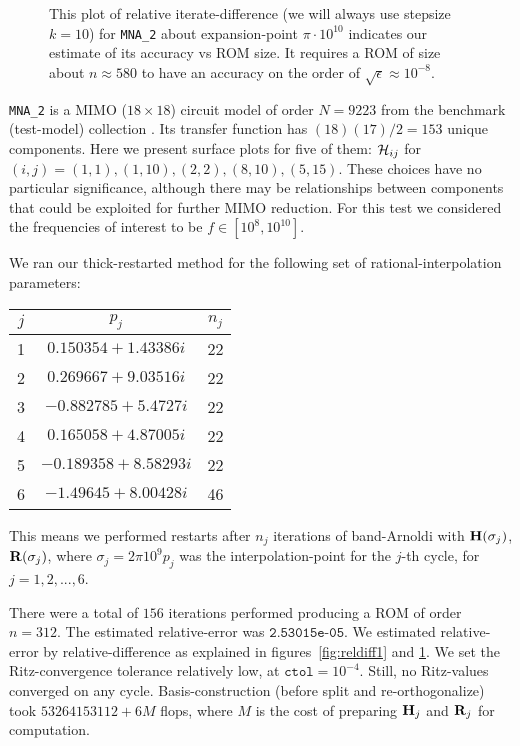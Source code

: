 \begin{figure}
\centering
{}
\caption{\label{fig:reldiff2}This plot of relative iterate-difference (we will always use stepsize $k=10$) for \texttt{MNA\_2} about expansion-point $\pi\cdot10^{10}$ indicates our estimate of its accuracy vs ROM size.  It requires a ROM of size about $n\approx 580$ to have an accuracy on the order of $\sqrt{\epsilon}\approx10^{-8}$. }
\end{figure}
\texttt{MNA\_2} is a MIMO ($18 \times 18$) circuit model of order $N=9223$ from the benchmark (test-model) collection \cite{chahlaoui2002collection}.  Its transfer function has $(18)(17)/2 = 153$ unique components.  Here we present surface plots for five of them: $\mathcal{H}_{ij}$ for $(i,j) =  (1 ,1), (1 ,10),  (2 ,2), (8, 10), (5, 15)$.  These choices have no particular significance, although there may be relationships between components that could be exploited for further MIMO reduction.  For this test we considered the frequencies of interest to be $f\in[10^{8}, 10^{10}]$. 

We ran our thick-restarted method for the following set of rational-interpolation parameters: 
{\singlespacing
\begin{tabular}{ccc}
$j$ & $p_j$ & $n_j$\\
\hline
1 & $0.150354 + 1.43386i$ & 22 \\
2 & $0.269667 + 9.03516i$ & 22\\
3 & $-0.882785 + 5.4727i$ & 22\\
4 & $0.165058 + 4.87005i$ & 22 \\
5 & $-0.189358 + 8.58293i$ & 22\\
6 & $-1.49645 + 8.00428i$ & 46 \\
\end{tabular}
}

\medskip
This means we performed restarts after $n_j$ iterations of band-Arnoldi with $\textbf{\textup{H}}(\sigma_j)$, $\textbf{\textup{R}}(\sigma_j)$, where $\sigma_j = 2\pi10^9  p_j$ was the interpolation-point for the $j$-th cycle, for $j=1,2,...,6$.

There were a total of $156$ iterations performed producing a ROM of order $n=312$.  The estimated relative-error was $\texttt{2.53015e-05}$.  We estimated relative-error by relative-difference as explained in figures~\ref{fig:reldiff1} and \ref{fig:reldiff2}. We set the Ritz-convergence tolerance relatively low, at $\texttt{ctol}=10^{-4}$.  Still, no Ritz-values converged on any cycle.  Basis-construction (before split and re-orthogonalize) took  $53264153112 + 6M$ flops, where $M$ is the cost of preparing $\textbf{\textup{H}}_j$ and $\textbf{\textup{R}}_j$ for computation.   

